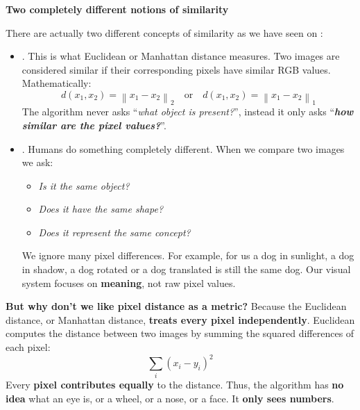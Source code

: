 \highspace
\begin{flushleft}
    \textcolor{Green3}{ \textbf{Two completely different notions of similarity}}
\end{flushleft}
There are actually two different concepts of similarity as we have seen on :
\begin{itemize}
    \item {}. This is what Euclidean or Manhattan distance measures. Two images are considered similar if their corresponding pixels have similar RGB values. Mathematically:
    \begin{equation*}
        d\left(x_1, x_2\right) = \left\|x_1 - x_2\right\|_{2} \quad \text{or} \quad d\left(x_1, x_2\right) = \left\|x_1 - x_2\right\|_{1}
    \end{equation*}
    The algorithm never asks ``\emph{what object is present?}'', instead it only asks ``\emph{\textbf{how similar are the pixel values?}}''.


    \item {}. Humans do something completely different. When we compare two images we ask:
    \begin{itemize}
        \item \emph{Is it the same object?}
        \item \emph{Does it have the same shape?}
        \item \emph{Does it represent the same concept?}
    \end{itemize}
    We ignore many pixel differences. For example, for us a dog in sunlight, a dog in shadow, a dog rotated or a dog translated is still the same dog. Our visual system focuses on \textbf{meaning}, not raw pixel values.
\end{itemize}
\textcolor{Green3}{ \textbf{But why don't we like pixel distance as a metric?}} Because the Euclidean distance, or Manhattan distance, \textbf{treats every pixel independently}. Euclidean computes the distance between two images by summing the squared differences of each pixel:
\begin{equation*}
    \sum_i \left(x_i - y_i\right)^2
\end{equation*}
Every \textbf{pixel contributes equally} to the distance. Thus, the algorithm has \textbf{no idea} what an eye is, or a wheel, or a nose, or a face. It \textbf{only sees numbers}.

